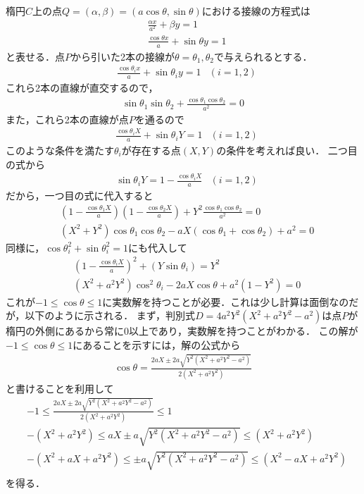 \documentclass[a4paper,10pt]{ltjsarticle}
\begin{document}
\begin{multicols}{2}
  楕円$C$上の点$Q=(\alpha,\beta)=(a\cos\theta,\sin\theta)$における接線の方程式は
  \begin{align*}
     & \frac{\alpha x}{a^2} + \beta y = 1        \\
     & \frac{\cos\theta x}{a} + \sin\theta y = 1
  \end{align*}
  と表せる．点$P$から引いた2本の接線が$\theta=\theta_1, \theta_2$で与えられるとする．
  \begin{align*}
     & \frac{\cos\theta_{i} x}{a} + \sin\theta_{i} y = 1 & (i = 1,2)
  \end{align*}
  これら2本の直線が直交するので，
  \begin{align}
    \sin\theta_1\sin\theta_2 + \frac{\cos\theta_1\cos\theta_2}{a^2} = 0
  \end{align}
  また，これら2本の直線が点$P$を通るので
  \begin{align}
     & \frac{\cos\theta_{i} X}{a} + \sin\theta_{i} Y = 1 & (i = 1,2)
  \end{align}
  このような条件を満たす$\theta_i$が存在する点$(X,Y)$の条件を考えれば良い．
  二つ目の式から
  \begin{align}
     & \sin\theta_{i} Y = 1 - \frac{\cos\theta_{i} X}{a} & (i = 1,2)
  \end{align}
  だから，一つ目の式に代入すると
  \begin{align}
     & \left(1 - \frac{\cos\theta_{1} X}{a} \right)\left(1 - \frac{\cos\theta_{2} X}{a} \right) +Y^2\frac{\cos\theta_1\cos\theta_2}{a^2} = 0 \\
     & \left(X^2+Y^2\right)\cos\theta_1\cos\theta_2 -aX(\cos\theta_1+\cos\theta_2) + a^2 = 0
  \end{align}
  同様に，$\cos\theta_{i}^2+\sin\theta_{i}^2=1$にも代入して
  \begin{align}
     & \left(1 - \frac{\cos\theta_{i} X}{a} \right)^2+\left(Y\sin\theta_{i}\right) = Y^2   \\
     & \left(X^2+a^2Y^2\right)\cos^2\theta_{i} - 2aX\cos\theta + a^2\left(1-Y^2\right) = 0
  \end{align}
  これが$-1\le\cos\theta\le 1$に実数解を持つことが必要．これは少し計算は面倒なのだが，以下のように示される．
  まず，判別式$D=4a^2Y^2(X^2+a^2Y^2-a^2)$は点$P$が楕円の外側にあるから常に$0$以上であり，実数解を持つことがわかる．
  この解が$-1\le\cos\theta\le 1$にあることを示すには，解の公式から
  \begin{align*}
    \cos\theta = \frac{2aX\pm 2a\sqrt{Y^2(X^2+a^2Y^2-a^2)}}{2(X^2+a^2Y^2)}
  \end{align*}
  と書けることを利用して
  \begin{align*}
     & -1 \le  \frac{2aX\pm 2a\sqrt{Y^2(X^2+a^2Y^2-a^2)}}{2(X^2+a^2Y^2)} \le 1    \\
     & -(X^2+a^2Y^2) \le aX\pm a\sqrt{Y^2(X^2+a^2Y^2-a^2)} \le (X^2+a^2Y^2)       \\
     & -(X^2+aX+a^2Y^2) \le \pm a\sqrt{Y^2(X^2+a^2Y^2-a^2)} \le (X^2-aX + a^2Y^2) \\
  \end{align*}
  を得る．


\end{multicols}
\end{document}
